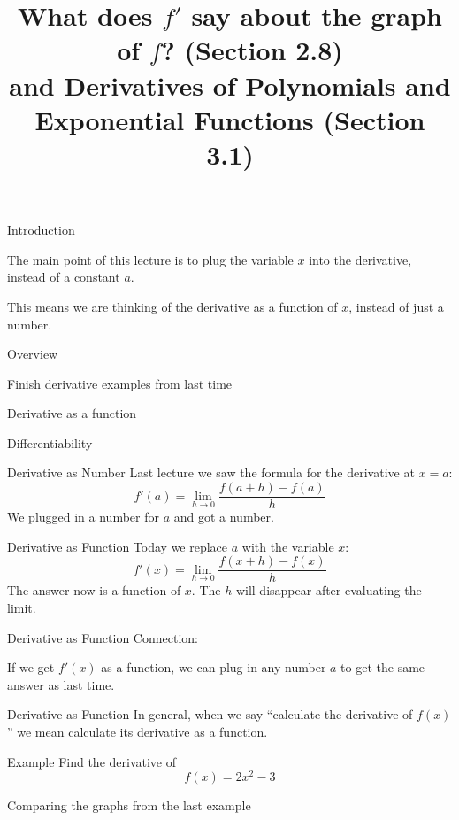 \documentclass[t]{beamer}
\title{What does $f'$ say about the graph of $f$?  (Section 2.8) \\
and Derivatives of Polynomials and Exponential Functions (Section 3.1)}
\date{}
\newenvironment{fpi}
  {\itemize[nolistsep,itemsep=\fill]}
  {\vfill\enditemize}
\begin{document}
\frame{\titlepage}

\begin{frame}{Introduction}
\begin{fpi}
\item The main point of this lecture is to plug the variable $x$ into the derivative, instead of a constant $a$.
\item This means we are thinking of the derivative as a function of $x$, instead of just a number.
\end{fpi}
\end{frame}

\begin{frame}{Overview}
\begin{fpi}
\item Finish derivative examples from last time
\item Derivative as a function
\item Differentiability
\end{fpi}
\end{frame}

\begin{frame}{Derivative as Number}
Last lecture we saw the formula for the derivative at $x = a$:
$$ f'(a) = \lim_{h \to 0} \frac{f(a + h) - f(a)}{h} $$
We plugged in a number for $a$ and got a number.
\end{frame}

\begin{frame}{Derivative as Function}
Today we replace $a$ with the variable $x$:
$$ f'(x) = \lim_{h \to 0} \frac{f(x + h) - f(x)}{h}$$
The answer now is a function of $x$.  The $h$ will disappear after evaluating the limit.
\end{frame}

\begin{frame}{Derivative as Function}
Connection:

If we get $f'(x)$ as a function, we can plug in any number $a$ to get the same
answer as last time.  
\end{frame}

\begin{frame}{Derivative as Function}
In general, when we say ``calculate the derivative of $f(x)$'' we mean calculate
its derivative as a function.
\end{frame}

\begin{frame}{Example}
Find the derivative of
$$f(x) = 2x^2 - 3$$
\end{frame}

\begin{frame}{Comparing the graphs from the last example}

\end{frame}
\end{document}
